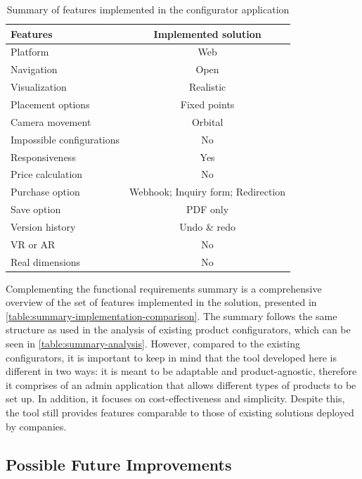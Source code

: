 \begin{table}[htb]
\centering
\begin{tabular}{lc} 
\toprule
\textbf{Features} &
\textbf{Implemented solution} \\ 
\midrule
Platform
    & Web \\ 
Navigation
    & Open \\ 
Visualization
    & Realistic \\ 
Placement options
    & Fixed points \\ 
Camera movement
    & Orbital \\
Impossible configurations
    & No\footnotemark \\
Responsiveness
    & Yes \\
Price calculation
    & No \\
Purchase option
    & Webhook; Inquiry form; Redirection \\
Save option
    & PDF only \\
Version history
    & Undo \& redo \\
VR or AR
    & No \\
Real dimensions
    & No \\
\bottomrule
\end{tabular}
\caption{Summary of features implemented in the configurator application}
\label{table:summary-implementation-comparison}
\end{table}

Complementing the functional requirements summary is a comprehensive overview of the set of features implemented in the solution, presented in \autoref{table:summary-implementation-comparison}. The summary follows the same structure as used in the analysis of existing product configurators, which can be seen in \autoref{table:summary-analysis}. However, compared to the existing configurators, it is important to keep in mind that the tool developed here is different in two ways: it is meant to be adaptable and product-agnostic, therefore it comprises of an admin application that allows different types of products to be set up. In addition, it focuses on cost-effectiveness and simplicity. Despite this, the tool still provides features comparable to those of existing solutions deployed by companies.

\subsection{Possible Future Improvements} \label{section:improvements}

